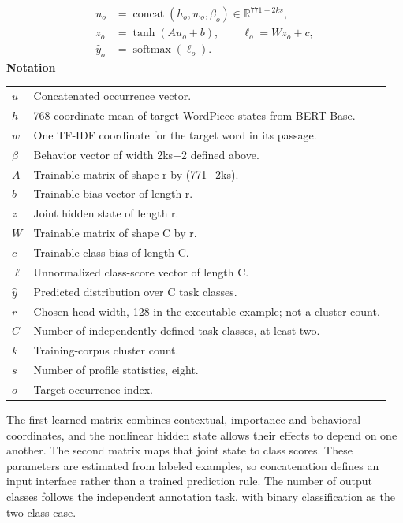 \documentclass[10pt,letterpaper]{article}
\newcommand{\notlabel}{\noindent\textbf{Notation}\par\nobreak\vspace{4pt}}
\begin{document}
\par\noindent\begin{minipage}{\linewidth}
\begin{equation}\label{eq:fusion}
\begin{aligned}u_o&=\operatorname{concat}(h_o,w_o,\beta_o)\in\mathbb R^{771+2ks},\\z_o&=\tanh(Au_o+b),\qquad\ell_o=Wz_o+c,\\\widehat y_o&=\operatorname{softmax}(\ell_o).\end{aligned}
\end{equation}
\notlabel
{\fontsize{8.5}{10.5}\selectfont\setlength{\tabcolsep}{0pt}\renewcommand{\arraystretch}{1.12}
\begin{tabularx}{\linewidth}{@{}p{.14\linewidth}X@{}}
$u$ & Concatenated occurrence vector.\\
$h$ & 768-coordinate mean of target WordPiece states from BERT Base.\\
$w$ & One TF-IDF coordinate for the target word in its passage.\\
$\beta$ & Behavior vector of width 2ks+2 defined above.\\
$A$ & Trainable matrix of shape r by (771+2ks).\\
$b$ & Trainable bias vector of length r.\\
$z$ & Joint hidden state of length r.\\
$W$ & Trainable matrix of shape C by r.\\
$c$ & Trainable class bias of length C.\\
$\ell$ & Unnormalized class-score vector of length C.\\
$\widehat y$ & Predicted distribution over C task classes.\\
$r$ & Chosen head width, 128 in the executable example; not a cluster count.\\
$C$ & Number of independently defined task classes, at least two.\\
$k$ & Training-corpus cluster count.\\
$s$ & Number of profile statistics, eight.\\
$o$ & Target occurrence index.\\
\end{tabularx}}
\par\vspace{2pt}
\end{minipage}\par
The first learned matrix combines contextual, importance and behavioral coordinates, and the nonlinear hidden state allows their effects to depend on one another. The second matrix maps that joint state to class scores. These parameters are estimated from labeled examples, so concatenation defines an input interface rather than a trained prediction rule. The number of output classes follows the independent annotation task, with binary classification as the two-class case.\par
\end{document}
